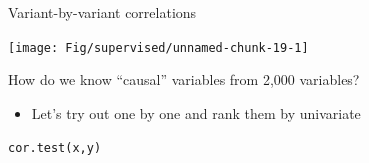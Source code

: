 \documentclass[
  ignorenonframetext,
  aspectratio=169]{beamer}
\providecommand{\tightlist}{%
  \setlength{\itemsep}{0pt}\setlength{\parskip}{0pt}}
\begin{document}
\begin{frame}{Variant-by-variant correlations}
\protect\hypertarget{variant-by-variant-correlations}{}
\scriptsize

\begin{center}\texttt{[image: Fig/supervised/unnamed-chunk-19-1]} \end{center}

\normalsize
\end{frame}

\begin{frame}[fragile]{How do we know ``causal'' variables from 2,000
variables?}
\protect\hypertarget{how-do-we-know-causal-variables-from-2000-variables}{}
\begin{itemize}
\tightlist
\item
  Let's try out one by one and rank them by univariate
\end{itemize}

\Large

\texttt{cor.test(x,y)}

\normalsize

\scriptsize

\normalsize

\scriptsize

\normalsize

\scriptsize


\normalsize

\scriptsize


\normalsize

\scriptsize


\normalsize

\scriptsize


\normalsize

\scriptsize


\normalsize
\end{frame}
\end{document}
